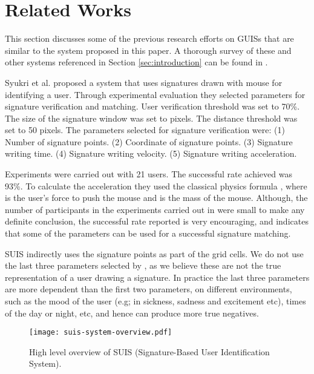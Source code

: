 \documentclass[conference]{IEEEtran}
\begin{document}
\section{Related Works}\label{sec:literature-review}

This section discusses some of the previous research efforts on GUISs that are similar to the system proposed in this paper. A thorough survey of these and other systems referenced in Section \ref{sec:introduction} can be found in \cite{gp-survey-acm,gp-survey-ieee}.

Syukri et al. \cite{signature-gp} proposed a system that uses signatures drawn with mouse for identifying a user. Through experimental evaluation they selected parameters for signature verification and matching. User verification threshold was set to 70\%. The size of the signature window was set to  pixels. The distance threshold was set to 50 pixels. The parameters selected for signature verification were:
(1) Number of signature points.
(2) Coordinate of signature points.
(3) Signature writing time.
(4) Signature writing velocity.
(5) Signature writing acceleration.

Experiments were carried out with 21 users. The successful rate achieved was 93\%. To calculate the acceleration they used the classical physics formula , where  is the user's force to push the mouse and  is the mass of the mouse. Although, the number of participants in the experiments carried out in \cite{signature-gp} were small to make any definite conclusion, the successful rate reported is very encouraging, and indicates that some of the parameters can be used for a successful signature matching.

SUIS indirectly uses the signature points as part of the grid cells. We do not use the last three parameters selected by \cite{signature-gp}, as we believe these are not the true representation of a user drawing a signature. In practice the last three parameters are more dependent than the first two parameters, on different environments, such as the mood of the user (e.g; in sickness, sadness and excitement etc), times of the day or night, etc, and hence can produce more true negatives.


\begin{figure*}[htbp]
\centering
   {\texttt{[image: suis-system-overview.pdf]}}
\caption{High level overview of SUIS (Signature-Based User Identification System).}
\label{fig:suis-system-overview}
\end{figure*}
\end{document}
